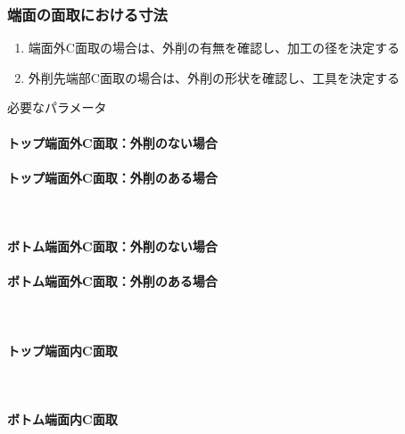 \subsubsection{端面の面取における寸法}
\begin{enumerate}
\item {}端面外C面取の場合は、外削の有無を確認し、加工の径を決定する
\item {}外削先端部C面取の場合は、外削の形状を確認し、工具を決定する
\end{enumerate}
\begin{Parameter}{必要なパラメータ}
\paragraph*{トップ端面外C面取：外削のない場合}
\PMACOD
\PMBDOD
{}
\PMODCornerR
\tcbline*
\paragraph*{トップ端面外C面取：外削のある場合}
\\
\tcbline*
\paragraph*{ボトム端面外C面取：外削のない場合}
\PMACOD
\PMBDOD
{}
\PMODCornerR
\tcbline*
\paragraph*{ボトム端面外C面取：外削のある場合}
\\
\tcbline*
\paragraph*{トップ端面内C面取}
\PMTopEndACID
\PMTopEndBDID
\PMTopEndIDCornerR\\
\PMPlatingThk
\tcbline*
\paragraph*{ボトム端面内C面取}
\PMBottomEndACID
\PMBottomEndBDID
\PMBottomEndIDCornerR\\
\PMPlatingThk
\end{Parameter}

